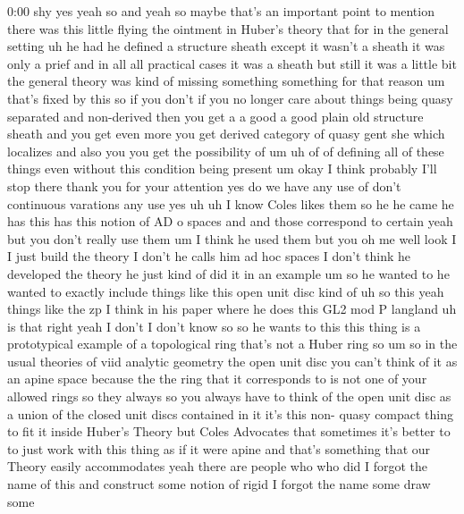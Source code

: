 \begin{unfinished}{0:00}
shy  yes  yeah  so  and  yeah  so  maybe  that's
an  important  point  to  mention  there  was
this  little  flying  the  ointment  in
Huber's  theory  that  for  in  the  general
setting  uh  he  had  he  defined  a  structure
sheath  except  it  wasn't  a  sheath  it  was
only  a  prief  and  in  all  all  practical
cases  it  was  a  sheath  but  still  it  was  a
little  bit  the  general  theory  was  kind
of  missing  something  something  for  that
reason  um  that's  fixed  by  this  so  if  you
don't  if  you  no  longer  care  about  things
being  quasy  separated  and  non-derived
then  you  get  a  a  good  a  good  plain  old
structure  sheath  and  you  get  even  more
you  get  derived  category  of  quasy  gent
she  which  localizes  and  also  you  you  get
the  possibility  of  um  uh  of  of  defining
all  of  these  things  even  without  this
condition  being
present
um  okay  I  think  probably  I'll  stop  there
thank  you  for  your
attention
yes  do  we  have  any  use  of  don't
continuous
varations  any  use  yes
uh  uh  I  know  Coles  likes  them  so  he  he
came  he  has  this  has  this  notion  of  AD  o
spaces  and  and  those  correspond  to
certain  yeah  but  you  don't  really  use
them  um  I  think  he  used  them  but  you  oh
me  well  look  I  I  just  build  the  theory  I
don't  he  calls  him  ad  hoc  spaces  I  don't
think  he  developed  the  theory  he  just
kind  of  did  it  in  an  example  um  so  he
wanted  to  he  wanted  to  exactly  include
things  like  this  open  unit
disc  kind  of  uh  so  this  yeah  things  like
the  zp  I  think  in  his  paper  where  he
does  this  GL2  mod  P
langland  uh  is  that  right  yeah  I  don't  I
don't  know  so
so  he  wants  to  this  this  thing  is  a
prototypical  example  of  a  topological
ring  that's  not  a  Huber  ring
so  um  so  in  the  usual  theories  of  viid
analytic  geometry  the  open  unit  disc  you
can't  think  of  it  as  an  apine  space
because  the  the  ring  that  it  corresponds
to  is  not  one  of  your  allowed  rings  so
they  always  so  you  always  have  to  think
of  the  open  unit  disc  as  a  union  of  the
closed  unit  discs  contained  in  it  it's
this  non-  quasy  compact  thing  to  fit  it
inside  Huber's  Theory  but  Coles
Advocates  that  sometimes  it's  better  to
to  just  work  with  this  thing  as  if  it
were  apine  and  that's  something  that  our
Theory  easily
accommodates  yeah  there  are  people  who
who  did  I  forgot  the  name  of  this
and  construct  some  notion  of
rigid  I  forgot  the  name  some  draw  some

\end{unfinished}
